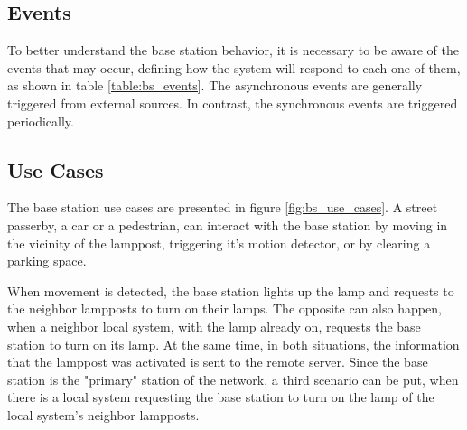 \subsection{Events}
To better understand the base station behavior, it is necessary to be aware of the events that may occur, defining how the system will respond to each one of them, as shown in table \ref{table:bs_events}. The asynchronous events are generally triggered from external sources. In contrast, the synchronous events are triggered periodically.

\begin{table}[h]
	\centering
	
	\caption{Base station events.}
	\label{table:bs_events}
\end{table}

\subsection{Use Cases}
The base station use cases are presented in figure \ref{fig:bs_use_cases}. A street passerby, a car or a pedestrian, can interact with the base station by moving in the vicinity of the lamppost, triggering it's motion detector, or by clearing a parking space.

When movement is detected, the base station lights up the lamp and requests to the neighbor lampposts to turn on their lamps. The opposite can also happen, when a neighbor local system, with the lamp already on, requests the base station to turn on its lamp. At the same time, in both situations, the information that the lamppost was activated is sent to the remote server. Since the base station is the "primary" station of the network, a third scenario can be put, when there is a local system requesting the base station to turn on the lamp of the local system's neighbor lampposts.

